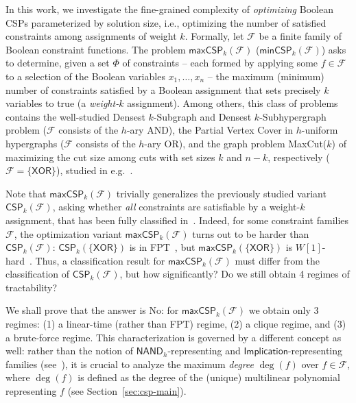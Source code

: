 \documentclass[a4paper,UKenglish,cleveref, autoref, thm-restate,numberwithinsect]{lipics-v2021}
\newcommand{\cspk}{\textsf{CSP}_{k}}
\newcommand{\maxcspk}{\textsf{maxCSP}_{k}}
\newcommand{\mincspk}{\textsf{minCSP}_{k}}
\newcommand{\Fam}{\mathcal{F}}
\newcommand{\nand}{\textsf{NAND}\xspace}
\newcommand{\xor}{\textsf{XOR}\xspace}
\newcommand{\impl}{\textsf{Implication}\xspace}
\begin{document}
In this work, we investigate the fine-grained complexity of \emph{optimizing} Boolean CSPs parameterized by solution size, i.e., optimizing the number of satisfied constraints among assignments of weight $k$. Formally, let $\Fam$ be a finite family of Boolean constraint functions. The problem $\maxcspk(\Fam)$ ($\mincspk(\Fam)$) asks to determine, given a set $\Phi$ of constraints -- each formed by applying some $f\in \Fam$ to a selection of the Boolean variables $x_1,\dots, x_n$ -- the maximum (minimum) number of constraints satisfied by a Boolean assignment that sets precisely $k$ variables to true (a \emph{weight-$k$} assignment). Among others, this class of problems contains the well-studied Densest $k$-Subgraph and Densest $k$-Subhypergraph problem ($\Fam$ consists of the $h$-ary AND), the Partial Vertex Cover in $h$-uniform hypergraphs ($\Fam$ consists of the $h$-ary OR), and the graph problem MaxCut($k$) of maximizing the cut size among cuts with set sizes $k$ and $n-k$, respectively ($\Fam = \{ \xor \}$), studied in e.g.~\cite{Cai08}.

Note that $\maxcspk(\Fam)$ trivially generalizes the previously studied variant $\cspk(\Fam)$, asking whether \emph{all} constraints are satisfiable by a weight-$k$ assignment, that has been fully classified in~\cite{Marx05, KunnemannM20}. Indeed, for some constraint families $\Fam$, the optimization variant $\maxcspk(\Fam)$ turns out to be harder than $\cspk(\Fam)$: $\cspk(\{\xor\})$ is in FPT~\cite{KunnemannM20}, but $\maxcspk(\{\xor\})$ is $W[1]$-hard~\cite{Cai08}. Thus, a classification result for $\maxcspk(\Fam)$ must differ from the classification of $\cspk(\Fam)$, but how significantly? Do we still obtain 4 regimes of tractability?

We shall prove that the answer is No: for $\maxcspk(\Fam)$ we obtain only 3 regimes: (1) a linear-time (rather than FPT) regime, (2) a clique regime, and (3) a brute-force regime. This characterization is governed by a different concept as well: rather than the notion of $\nand_h$-representing and $\impl$-representing families (see~\cite{KunnemannM20}), it is crucial to analyze the maximum \emph{degree} $\deg(f)$ over $f\in \Fam$, where $\deg(f)$ is defined as the degree of the (unique) multilinear polynomial representing $f$ (see Section~\ref{sec:csp-main}).
\end{document}
